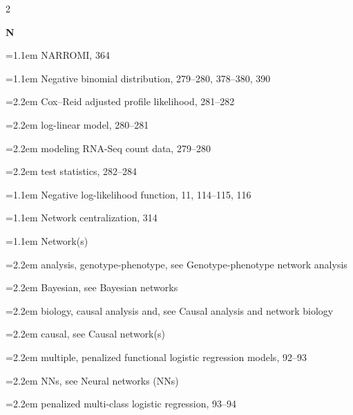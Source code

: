 \begin{multicols}{2}
\par{}\medskip\noindent\textbf{N}\par\nobreak\smallskip\nobreak
\noindent\hangindent=1.1em NARROMI, 364\par
\noindent\hangindent=1.1em Negative binomial distribution, 279--280, 378--380, 390\par
\noindent\hangindent=2.2em \hspace*{1.1em}Cox--Reid adjusted profile likelihood, 281--282\par
\noindent\hangindent=2.2em \hspace*{1.1em}log-linear model, 280--281\par
\noindent\hangindent=2.2em \hspace*{1.1em}modeling RNA-Seq count data, 279--280\par
\noindent\hangindent=2.2em \hspace*{1.1em}test statistics, 282--284\par
\noindent\hangindent=1.1em Negative log-likelihood function, 11, 114--115, 116\par
\noindent\hangindent=1.1em Network centralization, 314\par
\noindent\hangindent=1.1em Network(s)\par
\noindent\hangindent=2.2em \hspace*{1.1em}analysis, genotype-phenotype, see Genotype-phenotype network analysis\par
\noindent\hangindent=2.2em \hspace*{1.1em}Bayesian, see Bayesian networks\par
\noindent\hangindent=2.2em \hspace*{1.1em}biology, causal analysis and, see Causal analysis and network biology\par
\noindent\hangindent=2.2em \hspace*{1.1em}causal, see Causal network(s)\par
\noindent\hangindent=2.2em \hspace*{1.1em}multiple, penalized functional logistic regression models, 92--93\par
\noindent\hangindent=2.2em \hspace*{1.1em}NNs, see Neural networks (NNs)\par
\noindent\hangindent=2.2em \hspace*{1.1em}penalized multi-class logistic regression, 93--94\par

\end{multicols}
